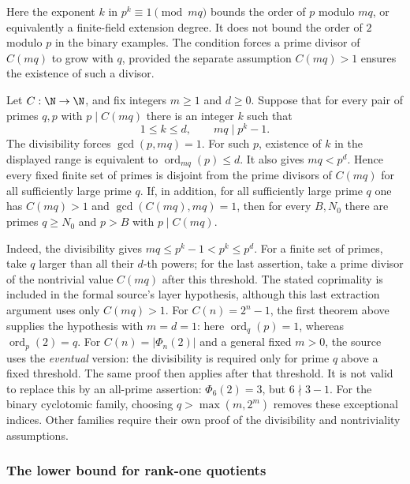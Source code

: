 Here the exponent $k$ in $p^k\equiv1\pmod{mq}$ bounds the order
of $p$ modulo $mq$, or equivalently a finite-field extension degree.
It does not bound the order of $2$ modulo $p$ in the binary examples.
The condition forces a prime divisor of $C(mq)$ to grow with $q$,
provided the separate assumption $C(mq)>1$ ensures the existence of
such a divisor.

\begin{thm}\label{thm:sufficient-order-hypothesis-unbounded-prime}
Let $C:\N\to\N$, and fix integers $m\ge1$ and $d\ge0$. Suppose that
for every pair of primes $q,p$ with $p\mid C(mq)$ there is an integer
$k$ such that
\[
 1\le k\le d,\qquad mq\mid p^k-1.
\]
The divisibility forces $\gcd(p,mq)=1$. For such $p$, existence of
$k$ in the displayed range is equivalent to
$\operatorname{ord}_{mq}(p)\le d$. It also gives $mq<p^d$.
Hence every fixed finite set of primes is disjoint from
the prime divisors of $C(mq)$ for all sufficiently large prime $q$.
If, in addition, for all sufficiently large prime $q$ one has
$C(mq)>1$ and $\gcd(C(mq),mq)=1$, then for every $B,N_0$ there are
primes $q\ge N_0$ and $p>B$ with $p\mid C(mq)$.

Indeed, the divisibility gives $mq\le p^k-1<p^k\le p^d$.
For a finite set of primes, take $q$ larger than all their $d$-th powers;
for the last assertion, take a prime divisor of the nontrivial value
$C(mq)$ after this threshold. The stated coprimality is included in the
formal source's layer hypothesis, although this last extraction argument
uses only $C(mq)>1$.
For $C(n)=2^n-1$, the first theorem above supplies the hypothesis with
$m=d=1$: here $\operatorname{ord}_q(p)=1$, whereas
$\operatorname{ord}_p(2)=q$. For $C(n)=|\Phi_n(2)|$ and a general fixed $m>0$, the source
uses the \emph{eventual} version: the divisibility is required only for
prime $q$ above a fixed threshold. The same proof then applies after that
threshold. It is not valid to replace this by an all-prime assertion:
$\Phi_6(2)=3$, but $6\nmid3-1$. For the binary cyclotomic family, choosing
$q>\max(m,2^m)$ removes these exceptional indices. Other families require
their own proof of the divisibility and nontriviality assumptions.
\end{thm}

\subsubsection{The lower bound for rank-one quotients}
\label{rank-one-subrank}

